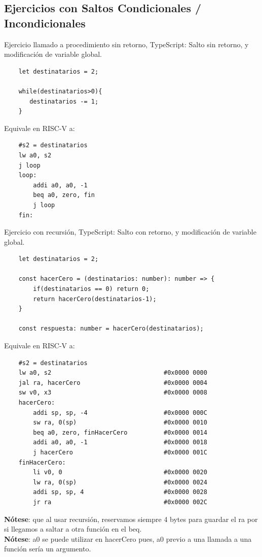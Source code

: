 \documentclass[10pt,a4paper]{article}
\begin{document}
\subsection*{Ejercicios con Saltos Condicionales / Incondicionales}
\label{subsec:ejercicios_con_saltos_condicionales_incondicionales}
Ejercicio llamado a procedimiento sin retorno,
TypeScript: Salto sin retorno, y modificación de variable global. 
\begin{lstlisting}
    let destinatarios = 2;

    while(destinatarios>0){
       destinatarios -= 1;
    }
\end{lstlisting}
Equivale en RISC-V a:
\begin{lstlisting}
    #s2 = destinatarios
    lw a0, s2 
    j loop
    loop: 
        addi a0, a0, -1
        beq a0, zero, fin 
        j loop
    fin:  
\end{lstlisting}
\label{ejercicio:saltos_condicionales_argumentos}
Ejercicio con recursión, 
TypeScript: Salto con retorno, y modificación de variable global. 
\begin{lstlisting}
    let destinatarios = 2;

    const hacerCero = (destinatarios: number): number => {
        if(destinatarios == 0) return 0; 
        return hacerCero(destinatarios-1);
    }

    const respuesta: number = hacerCero(destinatarios);
\end{lstlisting}
Equivale en RISC-V a:
\begin{lstlisting}
    #s2 = destinatarios
    lw a0, s2                               #0x0000 0000                 
    jal ra, hacerCero                       #0x0000 0004
    sw v0, x3                               #0x0000 0008                                   
    hacerCero:        
        addi sp, sp, -4                     #0x0000 000C
        sw ra, 0(sp)                        #0x0000 0010 
        beq a0, zero, finHacerCero          #0x0000 0014
        addi a0, a0, -1                     #0x0000 0018
        j hacerCero                         #0x0000 001C
    finHacerCero: 
        li v0, 0                            #0x0000 0020
        lw ra, 0(sp)                        #0x0000 0024
        addi sp, sp, 4                      #0x0000 0028
        jr ra                               #0x0000 002C
\end{lstlisting}
\textbf{Nótese}: que al usar recursión, reservamos siempre 4 bytes para guardar el ra por si llegamos a saltar a otra función en el beq. \\
\textbf{Nótese}: a0 se puede utilizar en hacerCero pues, a0 previo a una llamada a una función sería un argumento.
\end{document}
